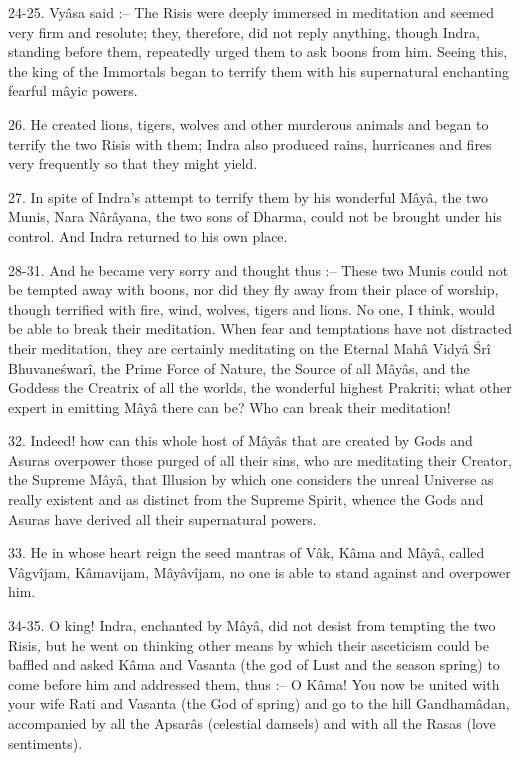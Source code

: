 24-25. Vy\^asa said :-- The Risis were deeply immersed in meditation and seemed very firm and resolute; they, therefore, did not reply anything, though Indra, standing before them, repeatedly urged them to ask boons from him. Seeing this, the king of the Immortals began to terrify them with his supernatural enchanting fearful m\^ayic powers.

26. He created lions, tigers, wolves and other murderous animals and began to terrify the two Risis with them; Indra also produced rains, hurricanes and fires very frequently so that they might yield.

27. In spite of Indra's attempt to terrify them by his wonderful M\^ay\^a, the two Munis, Nara N\^ar\^ayana, the two sons of Dharma, could not be brought under his control. And Indra returned to his own place.

28-31. And he became very sorry and thought thus :-- These two Munis could not be tempted away with boons, nor did they fly away from their place of worship, though terrified with fire, wind, wolves, tigers and lions. No one, I think, would be able to break their meditation. When fear and temptations have not distracted their meditation, they are certainly meditating on the Eternal Mah\^a Vidy\^a \'Sr\^i Bhuvane\'swar\^i, the Prime Force of Nature, the Source of all M\^ay\^as, and the Goddess the Creatrix of all the worlds, the wonderful highest Prakriti; what other expert in emitting M\^ay\^a there can be? Who can break their meditation!

32. Indeed! how can this whole host of M\^ay\^as that are created by Gods and Asuras overpower those purged of all their sins, who are meditating their Creator, the Supreme M\^ay\^a, that Illusion by which one considers the unreal Universe as really existent and as distinct from the Supreme Spirit, whence the Gods and Asuras have derived all their supernatural powers.

33. He in whose heart reign the seed mantras of V\^ak, K\^ama and M\^ay\^a, called V\^agv\^ijam, K\^amavijam, M\^ay\^av\^ijam, no one is able to stand against and overpower him.

34-35. O king! Indra, enchanted by M\^ay\^a, did not desist from tempting the two Risis, but he went on thinking other means by which their asceticism could be baffled and asked K\^ama and Vasanta (the god of Lust and the season spring) to come before him and addressed them, thus :-- O K\^ama! You now be united with your wife Rati and Vasanta (the God of spring) and go to the hill Gandham\^adan, accompanied by all the Apsar\^as (celestial damsels) and with all the Rasas (love sentiments).

